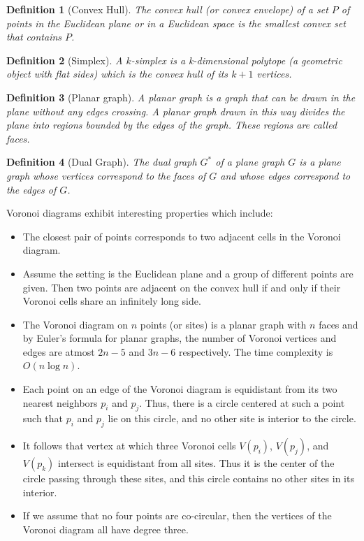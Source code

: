 \documentclass[10pt,a4paper]{article}
\newtheorem{defn}{Definition}
\begin{document}
      \begin{defn}[Convex Hull]
      	The convex hull (or convex envelope) of a set $P$ of points in the Euclidean plane or in a Euclidean space is the smallest convex set that contains $P$.
      \end{defn}
       \begin{defn}[Simplex]
       	A $k$-simplex is a k-dimensional polytope (a geometric object with flat sides) which is the convex hull of its $k+1$ vertices.
       \end{defn}
       \begin{defn}[Planar graph]
       	A planar graph is a graph that can be drawn in the plane without any edges crossing. A planar graph drawn in this way divides the plane into regions bounded by the edges of the graph. These regions are called faces. 
       \end{defn} 
       \begin{defn}[Dual Graph]
       	The dual graph $G^*$ of a plane graph $G$ is a plane graph whose vertices correspond to the faces of $G$ and whose edges correspond to the edges of $G$.
       \end{defn}
      
      Voronoi diagrams exhibit interesting properties which include:
      \begin{itemize}
      	\item The closest pair of points corresponds to two adjacent cells in the Voronoi diagram.
      	\item Assume the setting is the Euclidean plane and a group of different points are given. Then two points are adjacent on the convex hull if and only if their Voronoi cells share an infinitely long side.
      	\item The Voronoi diagram on $n$ points (or sites) is a planar graph with $n$ faces and by Euler's formula for planar graphs, the number of Voronoi vertices and edges are atmost $2n-5$ and $3n-6$ respectively. The time complexity is $O(n \log{n})$.
      	\item Each point on an edge of the Voronoi diagram is equidistant from its two nearest neighbors $p_i$ and $p_j$. Thus, there is a circle centered at such a point such that $p_i$ and $p_j$ lie
      	on this circle, and no other site is interior to the circle.
      	\item It follows that vertex at which three Voronoi cells $V(p_i)$, $V(p_j)$, and $V(p_k)$ intersect is equidistant from all sites. Thus it is the center of the circle passing through these sites, and this circle contains no other sites in its interior.
      	\item If we assume that no four points are co-circular, then the vertices of the Voronoi diagram all have degree three.
      	
      \end{itemize}
      
\end{document}
